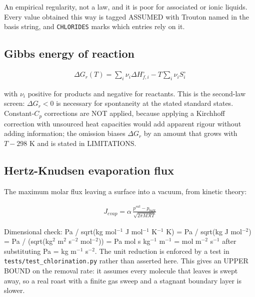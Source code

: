 \documentclass[10pt,a4paper,twoside]{report}
\begin{document}
An empirical regularity, not a law, and it is poor for associated or ionic liquids. Every value obtained this way is tagged ASSUMED with Trouton named in the basis string, and \texttt{CHLORIDES} marks which entries rely on it.

\subsection*{Gibbs energy of reaction}

\begin{equation*}
\begin{gathered}
\Delta G_r(T) = \sum_i \nu_i \Delta H_{f,i}^{\circ} - T \sum_i \nu_i S_i^{\circ}
\end{gathered}
\end{equation*}

with $\nu_i$ positive for products and negative for reactants. This is the second-law screen: $\Delta G_r < 0$ is necessary for spontaneity at the stated standard states. Constant-$C_p$ corrections are NOT applied, because applying a Kirchhoff correction with unsourced heat capacities would add apparent rigour without adding information; the omission biases $\Delta G_r$ by an amount that grows with $T - 298$ K and is stated in LIMITATIONS.

\subsection*{Hertz-Knudsen evaporation flux}

The maximum molar flux leaving a surface into a vacuum, from kinetic theory:

\begin{equation*}
\begin{gathered}
J_{evap} = \alpha\,\frac{p^{sat} - p_{bulk}}{\sqrt{2\pi M \mathcal{R} T}}
\end{gathered}
\end{equation*}

Dimensional check: Pa / sqrt(kg mol$^{-1}$ J mol$^{-1}$ K$^{-1}$ K) = Pa / sqrt(kg J mol$^{-2}$) = Pa / (sqrt(kg$^{2}$ m$^{2}$ s$^{-2}$ mol$^{-2}$)) = Pa mol s kg$^{-1}$ m$^{-1}$ = mol m$^{-2}$ s$^{-1}$ after substituting Pa = kg m$^{-1}$ s$^{-2}$. The unit reduction is enforced by a test in \texttt{tests/test\_chlorination.py} rather than asserted here. This gives an UPPER BOUND on the removal rate: it assumes every molecule that leaves is swept away, so a real roast with a finite gas sweep and a stagnant boundary layer is slower.
\end{document}
